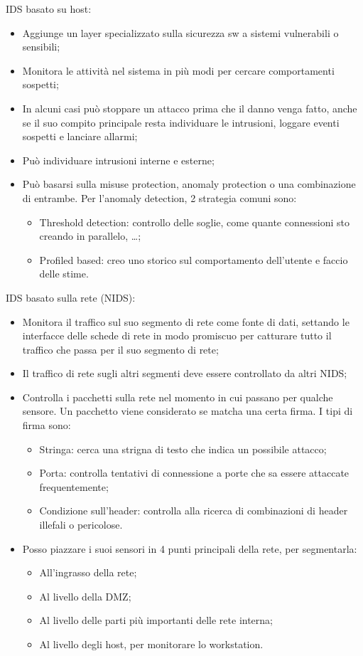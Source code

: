 IDS basato su host:
\begin{itemize}
    \item Aggiunge un layer specializzato sulla sicurezza sw a sistemi vulnerabili o sensibili;
	\item Monitora le attività nel sistema in più modi per cercare comportamenti sospetti;
	\item In alcuni casi può stoppare un attacco prima che il danno venga fatto, anche se il suo compito principale resta individuare le intrusioni, loggare eventi sospetti e lanciare allarmi;
	\item Può individuare intrusioni interne e esterne;
	\item Può basarsi sulla misuse protection, anomaly protection o una combinazione di entrambe. Per l'anomaly detection, 2 strategia comuni sono:
	\begin{itemize}
	    \item Threshold detection: controllo delle soglie, come quante connessioni sto creando in parallelo, …;
		\item Profiled based: creo uno storico sul comportamento dell'utente e faccio delle stime. 
	\end{itemize}
\end{itemize}

IDS basato sulla rete (NIDS):
\begin{itemize}
    \item Monitora il traffico sul suo segmento di rete come fonte di dati, settando le interfacce delle schede di rete in modo promiscuo per catturare tutto il traffico che passa per il suo segmento di rete;
	\item Il traffico di rete sugli altri segmenti deve essere controllato da altri NIDS;
	\item Controlla i pacchetti sulla rete nel momento in cui passano per qualche sensore. Un pacchetto viene considerato se matcha una certa firma. I tipi di firma sono:
	\begin{itemize}
	    \item Stringa: cerca una strigna di testo che indica un possibile attacco;
		\item Porta: controlla tentativi di connessione a porte che sa essere attaccate frequentemente;
		\item Condizione sull'header: controlla alla ricerca di combinazioni di header illefali o pericolose.
	\end{itemize}
	\item Posso piazzare i suoi sensori in 4 punti principali della rete, per segmentarla:
	\begin{itemize}
	    \item All'ingrasso della rete;
		\item Al livello della DMZ;
		\item Al livello delle parti più importanti delle rete interna;
		\item Al livello degli host, per monitorare lo workstation.
	\end{itemize}
\end{itemize}

